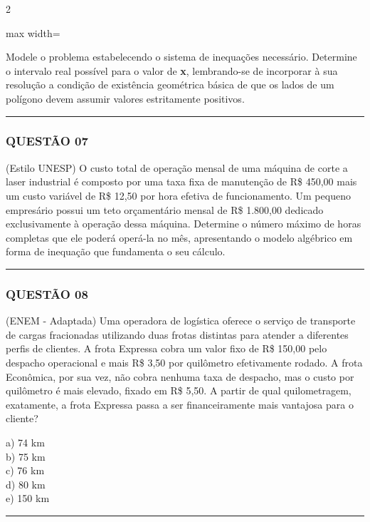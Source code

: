 \documentclass[twoside, 10pt, a4paper]{article}
\begin{document}
\begin{multicols*}{2}
\begin{center}
\begin{adjustbox}{max width=\linewidth}
\begin{tikzpicture}
\end{tikzpicture}
\end{adjustbox}
\end{center}

Modele o problema estabelecendo o sistema de inequações necessário. Determine o intervalo real possível para o valor de \textbf{x}, lembrando-se de incorporar à sua resolução a condição de existência geométrica básica de que os lados de um polígono devem assumir valores estritamente positivos.

\vspace{0cm} \noindent\textcolor{CorLinha}{\rule{\linewidth}{0.5pt}} \vspace{-0.2cm}
\subsubsection*{QUESTÃO 07}
(Estilo UNESP) O custo total de operação mensal de uma máquina de corte a laser industrial é composto por uma taxa fixa de manutenção de R\$ 450,00 mais um custo variável de R\$ 12,50 por hora efetiva de funcionamento. Um pequeno empresário possui um teto orçamentário mensal de R\$ 1.800,00 dedicado exclusivamente à operação dessa máquina. Determine o número máximo de horas completas que ele poderá operá-la no mês, apresentando o modelo algébrico em forma de inequação que fundamenta o seu cálculo.

\vspace{0cm} \noindent\textcolor{CorLinha}{\rule{\linewidth}{0.5pt}} \vspace{-0.2cm}
\subsubsection*{QUESTÃO 08}
(ENEM - Adaptada) Uma operadora de logística oferece o serviço de transporte de cargas fracionadas utilizando duas frotas distintas para atender a diferentes perfis de clientes. A frota Expressa cobra um valor fixo de R\$ 150,00 pelo despacho operacional e mais R\$ 3,50 por quilômetro efetivamente rodado. A frota Econômica, por sua vez, não cobra nenhuma taxa de despacho, mas o custo por quilômetro é mais elevado, fixado em R\$ 5,50. A partir de qual quilometragem, exatamente, a frota Expressa passa a ser financeiramente mais vantajosa para o cliente?

a) 74 km\\[0.3cm]
b) 75 km\\[0.3cm]
c) 76 km\\[0.3cm]
d) 80 km\\[0.3cm]
e) 150 km\\
\vspace{0cm} \noindent\textcolor{CorLinha}{\rule{\linewidth}{0.5pt}} \vspace{-0.2cm}

\end{multicols*}
\end{document}

